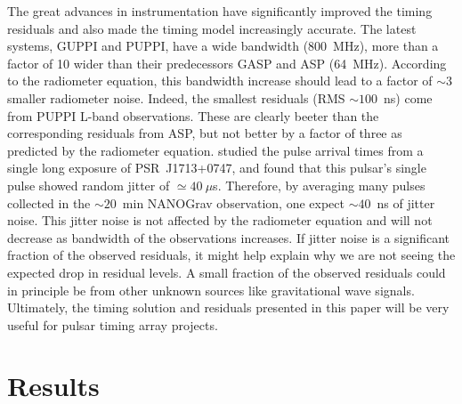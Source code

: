 The great advances in instrumentation have significantly improved the timing residuals and also made the timing model increasingly
accurate.
The latest systems, GUPPI and PUPPI, have a wide bandwidth (800~MHz), more than
a factor of 10 wider than their predecessors GASP and ASP
(64~MHz). According to the radiometer 
equation, this bandwidth increase should lead to a factor of $\sim3$
smaller radiometer noise. 
Indeed, the smallest residuals (RMS $\sim100$~ns) come from PUPPI L-band observations.
These are clearly beeter than the corresponding residuals from ASP, but not better by a factor of three
as predicted by the radiometer equation.
\citet{sc12} studied the pulse arrival times from a single long exposure of
PSR~J1713+0747, and found that this pulsar's single pulse showed random jitter of
$\simeq40~\mu$s. Therefore, by averaging many pulses collected in the
$\sim20$~min NANOGrav observation, one expect $\sim 40$~ns of jitter noise. 
This jitter noise is not affected by the radiometer equation and will not
decrease as bandwidth of the observations increases.
If jitter noise is a significant fraction of the observed residuals, it might
help explain why we are not seeing the expected drop in residual
levels.
A small fraction of the observed residuals could in principle be from other unknown sources like gravitational wave signals.
Ultimately, the timing solution and residuals presented in this paper
will be very useful for pulsar timing array projects.


\section{Results}
\label{sec:res}

